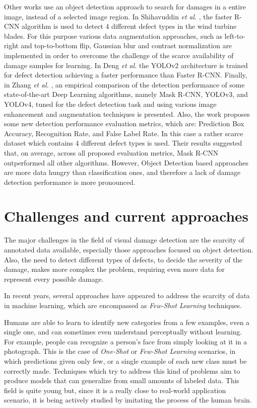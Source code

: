 Other works use an object detection approach to search for damages in a entire image, instead of a selected image region. In Shihavuddin \emph{et al.} \cite{shihavuddin2019imaging}, the faster R-CNN algorithm is used to detect 4 different defect types in the wind turbine blades. For this purpose various data augmentation approaches, such as left-to-right and top-to-bottom flip, Gaussian blur and contrast normalization are implemented in order to overcome the challenge of the scarce availability of damage samples for learning. In Deng \emph{et al.} \cite{deng2021imaging} the YOLOv2 architecture is trained for defect detection achieving a faster performance than Faster R-CNN. Finally, in Zhang \emph{et al.} \cite{zhang2021image}, an empirical comparison of the detection performance of some state-of-the-art Deep Learning algorithms, namely Mask R-CNN, YOLOv3, and YOLOv4, tuned for the defect detection task and using various image enhancement and augmentation techniques is presented. Also, the work proposes some new detection performance evaluation metrics, which are: Prediction Box Accuracy, Recognition Rate, and False Label Rate. In this case a rather scarce dataset which contains 4 different defect types is used. Their results suggested that, on average, across all proposed evaluation metrics, Mask R-CNN outperformed all other algorithms. However, Object Detection based approaches are more data hungry than classification ones, and therefore a lack of damage detection performance is more pronounced.


\section{Challenges and current approaches}
\label{sec:challenges}
The major challenges in the field of visual damage detection are the scarcity of annotated data available, especially those approaches focused on object detection. Also, the need to detect different types of defects, to decide the severity of the damage, makes more complex the problem, requiring even more data for represent every possible damage.

In recent years, several approaches have appeared to address the scarcity of data in machine learning, which are encompassed as \emph{Few-Shot Learning} techniques.

Humans are able to learn to identify new categories from a few examples, even a single one, and can sometimes even understand perceptually without learning. For example, people can recognize a person's face from simply looking at it in a photograph. This is the case of \emph{One-Shot} or \emph{Few-Shot Learning} scenarios, in which predictions given only few, or a single example of each new class must be correctly made. Techniques which try to address this kind of problems aim to produce models that can generalize from small amounts of labeled data. This field is quite young but, since it is a really close to real-world application scenario, it is being actively studied by imitating the process of the human brain.


